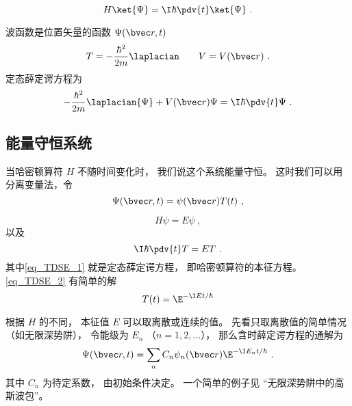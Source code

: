 
\begin{issues}
\issueDraft
\issueAbstract
{}
\end{issues}


\begin{equation}
H \ket{\Psi} = \I\hbar \pdv{t} \ket{\Psi}~.
\end{equation}


波函数是位置矢量的函数 $\Psi(\bvec r, t)$
\begin{equation}
T = -\frac{\hbar^2}{2m} \laplacian \qquad V = V(\bvec r)~.
\end{equation}
定态薛定谔方程为
\begin{equation}
-\frac{\hbar^2}{2m} \laplacian {\Psi} + V(\bvec r)\Psi = \I\hbar \pdv{t} \Psi~.
\end{equation}

\subsection{能量守恒系统}
当哈密顿算符 $H$ 不随时间变化时， 我们说这个系统能量守恒。 这时我们可以用分离变量法，令
\begin{equation}
\Psi(\bvec r, t) = \psi(\bvec r) T(t)~,
\end{equation}
 
\begin{equation}\label{eq_TDSE_1}
H\psi = E\psi~,
\end{equation}
以及
\begin{equation}\label{eq_TDSE_2}
\I \hbar\pdv{t}T = ET~.
\end{equation}
其中\autoref{eq_TDSE_1} 就是定态薛定谔方程， 即哈密顿算符的本征方程。 \autoref{eq_TDSE_2} 有简单的解
\begin{equation}
T(t) = \E^{-\I E t/\hbar}
\end{equation}

根据 $H$ 的不同， 本征值 $E$ 可以取离散或连续的值。 先看只取离散值的简单情况（如无限深势阱）， 令能级为 $E_n$ （$n = 1, 2, \dots$）， 那么含时薛定谔方程的通解为
\begin{equation}\label{eq_TDSE_5}
\Psi(\bvec r, t) = \sum_n C_n \psi_n(\bvec r) \E^{-\I E_n t/\hbar}~.
\end{equation}
其中 $C_n$ 为待定系数， 由初始条件决定。 一个简单的例子见 “无限深势阱中的高斯波包”。

